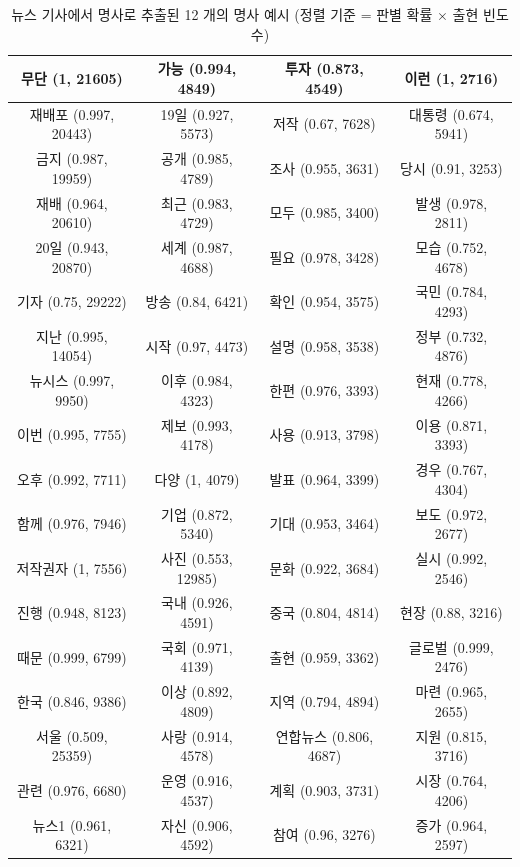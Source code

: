 \documentclass[11pt]{article}
\begin{document}
\begin{table}[H]
\small
\centering
\caption{뉴스 기사에서 명사로 추출된 12 개의 명사 예시 (정렬 기준 = 판별 확률 $\times$ 출현 빈도수)}
\label{tab:news_frequent_top100}
\begin{tabular}{|c|c|c|c|}
\hline
무단 (1, 21605) & 가능 (0.994, 4849) & 투자 (0.873, 4549) & 이런 (1, 2716) \\ \hline
재배포 (0.997, 20443) & 19일 (0.927, 5573) & 저작 (0.67, 7628) & 대통령 (0.674, 5941) \\ \hline
금지 (0.987, 19959) & 공개 (0.985, 4789) & 조사 (0.955, 3631) & 당시 (0.91, 3253) \\ \hline
재배 (0.964, 20610) & 최근 (0.983, 4729) & 모두 (0.985, 3400) & 발생 (0.978, 2811) \\ \hline
20일 (0.943, 20870) & 세계 (0.987, 4688) & 필요 (0.978, 3428) & 모습 (0.752, 4678) \\ \hline
기자 (0.75, 29222) & 방송 (0.84, 6421) & 확인 (0.954, 3575) & 국민 (0.784, 4293) \\ \hline
지난 (0.995, 14054) & 시작 (0.97, 4473) & 설명 (0.958, 3538) & 정부 (0.732, 4876) \\ \hline
뉴시스 (0.997, 9950) & 이후 (0.984, 4323) & 한편 (0.976, 3393) & 현재 (0.778, 4266) \\ \hline
이번 (0.995, 7755) & 제보 (0.993, 4178) & 사용 (0.913, 3798) & 이용 (0.871, 3393) \\ \hline
오후 (0.992, 7711) & 다양 (1, 4079) & 발표 (0.964, 3399) & 경우 (0.767, 4304) \\ \hline
함께 (0.976, 7946) & 기업 (0.872, 5340) & 기대 (0.953, 3464) & 보도 (0.972, 2677) \\ \hline
저작권자 (1, 7556) & 사진 (0.553, 12985) & 문화 (0.922, 3684) & 실시 (0.992, 2546) \\ \hline
진행 (0.948, 8123) & 국내 (0.926, 4591) & 중국 (0.804, 4814) & 현장 (0.88, 3216) \\ \hline
때문 (0.999, 6799) & 국회 (0.971, 4139) & 출현 (0.959, 3362) & 글로벌 (0.999, 2476) \\ \hline
한국 (0.846, 9386) & 이상 (0.892, 4809) & 지역 (0.794, 4894) & 마련 (0.965, 2655) \\ \hline
서울 (0.509, 25359) & 사랑 (0.914, 4578) & 연합뉴스 (0.806, 4687) & 지원 (0.815, 3716) \\ \hline
관련 (0.976, 6680) & 운영 (0.916, 4537) & 계획 (0.903, 3731) & 시장 (0.764, 4206) \\ \hline
뉴스1 (0.961, 6321) & 자신 (0.906, 4592) & 참여 (0.96, 3276) & 증가 (0.964, 2597) \\ \hline

\end{tabular}
\end{table}
\end{document}
